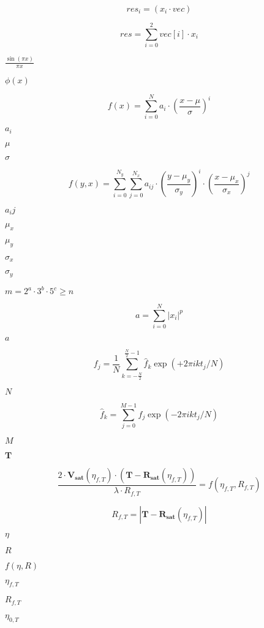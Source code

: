 \documentclass{article}
\begin{document}
\[ res_i = (x_i \cdot vec) \]
\pagebreak

\[ res = \sum_{i=0}^2 vec[i] \cdot x_i \]
\pagebreak

$ \frac{\sin(\pi x)}{\pi x} $
\pagebreak

$ \phi(x) $
\pagebreak

\[ f\left( x \right) = \sum_{i=0}^{N} a_i \cdot \left( \frac{x-\mu}{\sigma} \right)^i \]
\pagebreak

$a_i$
\pagebreak

$\mu$
\pagebreak

$\sigma$
\pagebreak

\[ f\left( y, x \right) = \sum_{i=0}^{N_y} \sum_{j=0}^{N_x} a_{ij} \cdot \left( \frac{y-\mu_y}{\sigma_y} \right)^i \cdot \left( \frac{x-\mu_x}{\sigma_x} \right)^j \]
\pagebreak

$a_ij$
\pagebreak

$\mu_x$
\pagebreak

$\mu_y$
\pagebreak

$\sigma_x$
\pagebreak

$\sigma_y$
\pagebreak

$ m = 2^a \cdot 3^b \cdot 5^c \geq n $
\pagebreak

\[ a = \sum_{i=0}^{N} |x_i|^p \]
\pagebreak

$a$
\pagebreak

\[ f_j = \frac{1}{N} \sum_{k=-\frac{N}{2}}^{\frac{N}{2}-1} \hat{f}_k \exp(+2\pi i k t_j / N) \]
\pagebreak

$ N $
\pagebreak

\[ \hat{f}_k = \sum_{j=0}^{M-1} f_j \exp(-2\pi i k t_j / N) \]
\pagebreak

$ M $
\pagebreak

$\mathbf{T}$
\pagebreak

\[ \frac{2 \cdot \mathbf{V_{sat}}\left( \eta_{f,T} \right) \cdot \left( \mathbf{T} - \mathbf{R_{sat}}\left(\eta_{f,T}\right) \right)}{\lambda \cdot R_{f,T}} = f\left(\eta_{f,T}, R_{f,T}\right) \]
\pagebreak

\[ R_{f,T} = \left|\mathbf{T} - \mathbf{R_{sat}}\left(\eta_{f,T} \right)\right| \]
\pagebreak

$\eta$
\pagebreak

$R$
\pagebreak

$f\left(\eta,R\right)$
\pagebreak

$\eta_{f,T}$
\pagebreak

$R_{f,T}$
\pagebreak

$\eta_{0,T}$
\pagebreak
\end{document}
